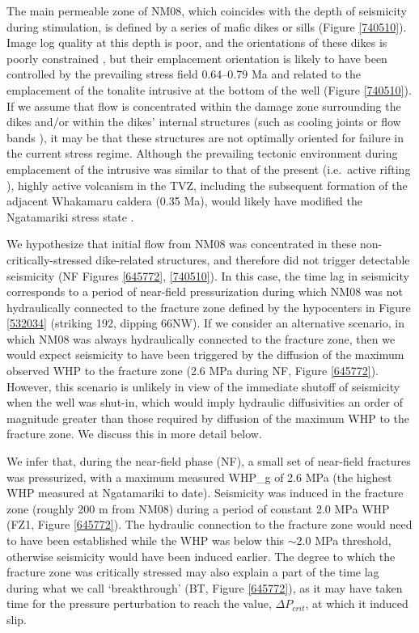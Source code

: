 The main permeable zone of NM08, which coincides with the depth of seismicity during \gls{stimulation}, is defined by a series of mafic dikes or sills \citep{Chambefort_2014,massiot_2012} (Figure \ref{740510}). Image log quality at this depth is poor, and the orientations of these dikes is poorly constrained \citep{massiot_2012}, but their emplacement orientation is likely to have been controlled by the prevailing stress field 0.64--0.79 Ma \citep{Chambefort_2014} and related to the emplacement of the tonalite intrusive at the bottom of the well (Figure \ref{740510}). If we assume that flow is concentrated within the damage zone surrounding the dikes and/or within the dikes' internal structures (such as cooling joints or flow bands \citep{Massiot_2017}), it may be that these structures are not optimally oriented for failure in the current stress regime. Although the prevailing tectonic environment during emplacement of the intrusive was similar to that of the present (i.e.\ active rifting \citep{Wilson_2016}), highly active volcanism in the TVZ, including the subsequent formation of the adjacent Whakamaru caldera (0.35 Ma), would likely have modified the Ngatamariki stress state \citep{Wilson_1995}.

We hypothesize that initial flow from NM08 was concentrated in these non-critically-stressed dike-related structures, and therefore did not trigger detectable seismicity (NF Figures \ref{645772}, \ref{740510}). In this case, the time lag in seismicity corresponds to a period of near-field pressurization during which NM08 was not hydraulically connected to the fracture zone defined by the hypocenters in Figure \ref{532034} (striking 192\textdegree, dipping 66\textdegree NW). If we consider an alternative scenario, in which NM08 was always hydraulically connected to the fracture zone, then we would expect seismicity to have been triggered by the diffusion of the maximum observed \acrshort{WHP} to the fracture zone (2.6 MPa during NF, Figure \ref{645772}). However, this scenario is unlikely in view of the immediate shutoff of seismicity when the well was shut-in, which would imply hydraulic diffusivities an order of magnitude greater than those required by diffusion of the maximum \acrshort{WHP} to the fracture zone. We discuss this in more detail below.

We infer that, during the near-field phase (NF), a small set of near-field fractures was pressurized, with a maximum measured \gls{WHP_g} of 2.6 MPa (the highest \acrshort{WHP} measured at Ngatamariki to date). Seismicity was induced in the fracture zone (roughly 200 m from NM08) during a period of constant 2.0 MPa \acrshort{WHP} (FZ1, Figure \ref{645772}). The hydraulic connection to the fracture zone would need to have been established while the \acrshort{WHP} was below this $\sim$2.0 MPa threshold, otherwise seismicity would have been induced earlier. The degree to which the fracture zone was critically stressed may also explain a part of the time lag during what we call `breakthrough' (BT, Figure \ref{645772}), as it may have taken time for the pressure perturbation to reach the value, $\Delta{P_{crit}}$, at which it induced slip.

